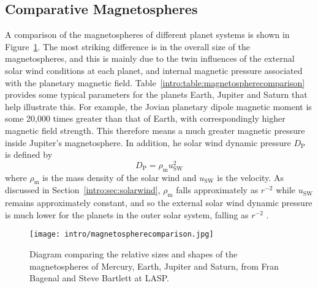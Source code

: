\subsection{Comparative Magnetospheres}\label{intro:sec:comparativemagnetospheres}
A comparison of the magnetospheres of different planet systems is shown in Figure~\ref{intro:fig:magnetospherecomparison}. The most striking difference is in the overall size of the magnetospheres, and this is mainly due to the twin influences of the external solar wind conditions at each planet, and internal magnetic pressure associated with the planetary magnetic field. Table~\ref{intro:table:magnetospherecomparison} provides some typical parameters for the planets Earth, Jupiter and Saturn that help illustrate this. For example, the Jovian planetary dipole magnetic moment is some 20,000 times greater than that of Earth, with correspondingly higher magnetic field strength. This therefore means a much greater magnetic pressure inside Jupiter's magnetosphere. In addition, he solar wind dynamic pressure $D_\mathrm{P}$ is defined by 
\begin{equation}\label{intro:eq:dp}
D_\mathrm{P} = \rho_\mathrm{m}u_\mathrm{SW}^2
\end{equation}
where $\rho_\mathrm{m}$ is the mass density of the solar wind and $u_\mathrm{SW}$ is the velocity. As discussed in Section~\ref{intro:sec:solarwind}, $\rho_\mathrm{m}$ falls approximately as $r^{-2}$ while $u_\mathrm{SW}$ remains approximately constant, and so the external solar wind dynamic pressure is much lower for the planets in the outer solar system, falling as $r^{-2}$ .
\begin{figure}
\centering
\noindent\texttt{[image: intro/magnetospherecomparison.jpg]}
\caption[Diagram of Mercury, Earth, Jupiter and Saturn magnetospheres.]{Diagram comparing the relative sizes and shapes of the magnetospheres of Mercury, Earth, Jupiter and Saturn, from Fran Bagenal and Steve Bartlett at LASP.}
\label{intro:fig:magnetospherecomparison}
\end{figure}
